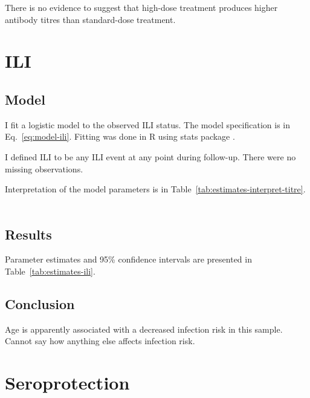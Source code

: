 \documentclass[11pt]{article}
\begin{document}
There is no evidence to suggest that high-dose treatment produces
higher antibody
titres than standard-dose treatment.

\section{ILI}

\subsection{Model}

I fit a logistic model to the observed ILI status.
The model specification is in Eq.~\ref{eq:model-ili}.
Fitting was done in R using stats package \cite{R}.

I defined ILI to be any ILI event at any point during follow-up. There were no
missing observations.

Interpretation of the model parameters is in
Table~\ref{tab:estimates-interpret-titre}.

\begin{equation}
    \begin{gathered}
        \label{eq:model-ili}
        
    \end{gathered}
\end{equation}





\subsection{Results}

Parameter estimates and 95\% confidence intervals
are presented in Table~\ref{tab:estimates-ili}.



\subsection{Conclusion}

Age is apparently associated with a decreased infection risk in this sample.
Cannot say how anything else affects infection risk.

\section{Seroprotection}
\end{document}
